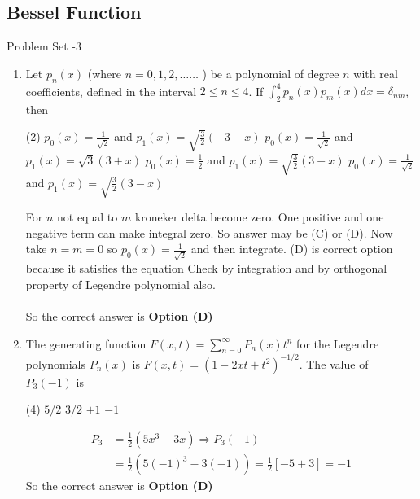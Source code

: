 \subsection{Bessel Function}
\newpage
\begin{abox}
	Problem Set -3
\end{abox}
\begin{enumerate}[label=\color{ocre}\textbf{\arabic*.}]
	\item  Let $p_{n}(x)$ (where $n=0,1,2, \ldots \ldots$ ) be a polynomial of degree $n$ with real coefficients, defined in the interval $2 \leq n \leq 4$. If $\int_{2}^{4} p_{n}(x) p_{m}(x) d x=\delta_{n m}$, then
	{}
	\begin{tasks}(2)
		\task[\textbf{A.}] $p_{0}(x)=\frac{1}{\sqrt{2}}$ and $p_{1}(x)=\sqrt{\frac{3}{2}}(-3-x)$
		\task[\textbf{B.}]  $p_{0}(x)=\frac{1}{\sqrt{2}}$ and $p_{1}(x)=\sqrt{3}(3+x)$
		\task[\textbf{C.}] $p_{0}(x)=\frac{1}{2}$ and $p_{1}(x)=\sqrt{\frac{3}{2}}(3-x)$
		\task[\textbf{D.}] $p_{0}(x)=\frac{1}{\sqrt{2}}$ and $p_{1}(x)=\sqrt{\frac{3}{2}}(3-x)$
	\end{tasks}
	\begin{answer}
		For $n$ not equal to $m$ kroneker delta become zero. One positive and one negative term can make integral zero. So answer may be (C) or (D). Now take $n=m=0$ so $p_{0}(x)=\frac{1}{\sqrt{2}}$ and then integrate. (D) is correct option because it satisfies the equation Check by integration and by orthogonal property of Legendre polynomial also.\\\\
		So the correct answer is \textbf{Option (D)}
	\end{answer}
	\item  The generating function $F(x, t)=\sum_{n=0}^{\infty} P_{n}(x) t^{n}$ for the Legendre polynomials $P_{n}(x)$ is $F(x, t)=\left(1-2 x t+t^{2}\right)^{-1 / 2}$. The value of $P_{3}(-1)$ is
	{}
	\begin{tasks}(4)
		\task[\textbf{A.}] $5 / 2$
		\task[\textbf{B.}] $3 / 2$
		\task[\textbf{C.}] $+1$
		\task[\textbf{D.}] $-1$
	\end{tasks}
	\begin{answer}
		\begin{align*}
		P_{3}&=\frac{1}{2}\left(5 x^{3}-3 x\right) \Rightarrow P_{3}(-1)\\&=\frac{1}{2}\left(5(-1)^{3}-3(-1)\right)=\frac{1}{2}[-5+3]=-1
		\end{align*}
		So the correct answer is \textbf{Option (D)}

\end{answer}
\end{enumerate}
